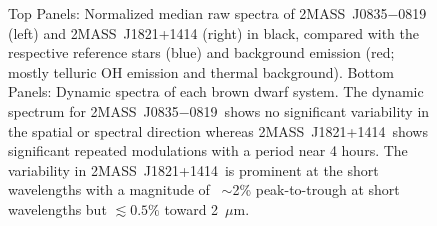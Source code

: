 \documentclass[twocolumn]{aastex6}
\newcommand{\sha}{2MASS~J0835$-$0819}
\newcommand{\shb}{2MASS~J1821+1414}
\begin{document}
\begin{figure}[!t]
\centering
{}
	\caption{Top Panels: Normalized median raw spectra of {\sha} (left) and {\shb} (right) in black, compared with the respective reference stars (blue) and background emission (red; mostly telluric OH emission and thermal background).  Bottom Panels: Dynamic spectra of each brown dwarf system. The dynamic spectrum for \sha\ shows no significant variability in the spatial or spectral direction whereas \shb\ shows significant repeated modulations with a period near 4 hours.
The variability in \shb\ is prominent at the short wavelengths with a magnitude of ~$\sim$2\% peak-to-trough at short wavelengths but $\lesssim 0.5\%$ toward 2~$\mu$m.}
	\label{fig:specphot}
	\vspace{0.1in}
\end{figure} 
\end{document}
